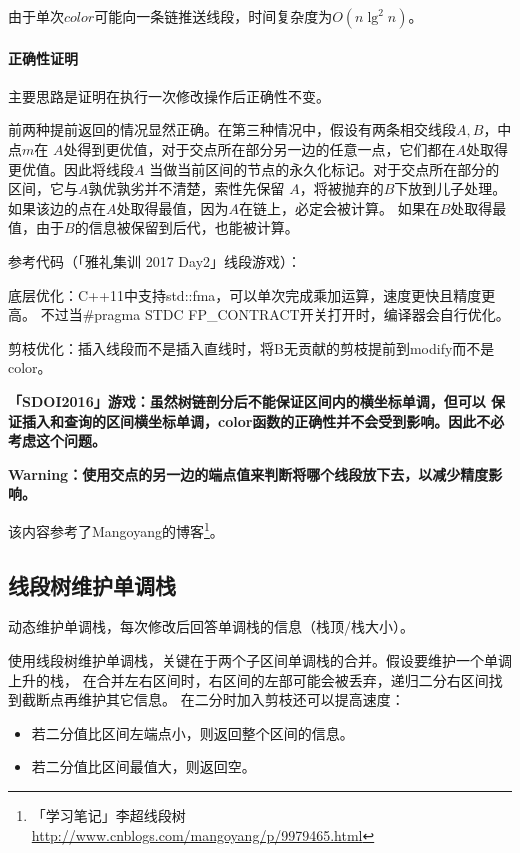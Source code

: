 由于单次$color$可能向一条链推送线段，时间复杂度为$O(n\lg^2 n)$。

\paragraph{正确性证明} 主要思路是证明在执行一次修改操作后正确性不变。

前两种提前返回的情况显然正确。在第三种情况中，假设有两条相交线段$A,B$，中点$m$在
$A$处得到更优值，对于交点所在部分另一边的任意一点，它们都在$A$处取得更优值。因此将线段$A$
当做当前区间的节点的永久化标记。对于交点所在部分的区间，它与$A$孰优孰劣并不清楚，索性先保留
$A$，将被抛弃的$B$下放到儿子处理。如果该边的点在$A$处取得最值，因为$A$在链上，必定会被计算。
如果在$B$处取得最值，由于$B$的信息被保留到后代，也能被计算。

参考代码（「雅礼集训 2017 Day2」线段游戏）：


底层优化：C++11中支持std::fma，可以单次完成乘加运算，速度更快且精度更高。
不过当\#pragma STDC FP\_CONTRACT开关打开时，编译器会自行优化。

剪枝优化：插入线段而不是插入直线时，将B无贡献的剪枝提前到modify而不是color。

{\bfseries 「SDOI2016」游戏：虽然树链剖分后不能保证区间内的横坐标单调，但可以
保证插入和查询的区间横坐标单调，color函数的正确性并不会受到影响。因此不必考虑这个问题。}

{\bfseries Warning：使用交点的另一边的端点值来判断将哪个线段放下去，以减少精度影响。}

该内容参考了Mangoyang的博客\footnote{
    「学习笔记」李超线段树
    \url{http://www.cnblogs.com/mangoyang/p/9979465.html}
}。
\subsection{线段树维护单调栈}
动态维护单调栈，每次修改后回答单调栈的信息（栈顶/栈大小）。

使用线段树维护单调栈，关键在于两个子区间单调栈的合并。假设要维护一个单调上升的栈，
在合并左右区间时，右区间的左部可能会被丢弃，递归二分右区间找到截断点再维护其它信息。
在二分时加入剪枝还可以提高速度：
\begin{itemize}
    \item 若二分值比区间左端点小，则返回整个区间的信息。
    \item 若二分值比区间最值大，则返回空。
\end{itemize}

